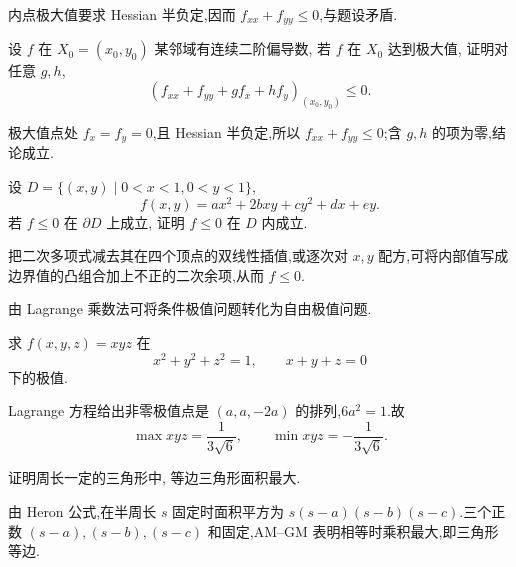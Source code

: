 \begin{solution}
    内点极大值要求 Hessian 半负定,因而 $f_{xx}+f_{yy}\leq0$,与题设矛盾.
\end{solution}

\begin{example}
    设 $f$ 在 $X_0=(x_0,y_0)$ 某邻域有连续二阶偏导数, 若 $f$ 在 $X_0$ 达到极大值, 证明对任意 $g,h$,
    \[
        \left(f_{xx}+f_{yy}+gf_x+hf_y\right)_{(x_0,y_0)}\leq0.
    \]
\end{example}
\exampleblank

\begin{solution}
    极大值点处 $f_x=f_y=0$,且 Hessian 半负定,所以 $f_{xx}+f_{yy}\leq0$;含 $g,h$ 的项为零,结论成立.
\end{solution}

\begin{example}
    设 $D=\{(x,y)\mid0<x<1,0<y<1\}$,
    \[
        f(x,y)=ax^2+2bxy+cy^2+dx+ey.
    \]
    若 $f\leq0$ 在 $\partial D$ 上成立, 证明 $f\leq0$ 在 $D$ 内成立.
\end{example}
\exampleblank

\begin{solution}
    把二次多项式减去其在四个顶点的双线性插值,或逐次对 $x,y$ 配方,可将内部值写成边界值的凸组合加上不正的二次余项,从而 $f\leq0$.
\end{solution}




由 Lagrange 乘数法可将条件极值问题转化为自由极值问题.

\begin{example}
    求 $f(x,y,z)=xyz$ 在
    \[
        x^2+y^2+z^2=1,
        \qquad x+y+z=0
    \]
    下的极值.
\end{example}
\exampleblank

\begin{solution}
    Lagrange 方程给出非零极值点是 $(a,a,-2a)$ 的排列,$6a^2=1$.故
    \[
        \max xyz=\dfrac{1}{3\sqrt{6}},\qquad
        \min xyz=-\dfrac{1}{3\sqrt{6}}.
    \]
\end{solution}

\begin{example}
    证明周长一定的三角形中, 等边三角形面积最大.
\end{example}
\exampleblank

\begin{solution}
    由 Heron 公式,在半周长 $s$ 固定时面积平方为 $s(s-a)(s-b)(s-c)$.三个正数 $(s-a),(s-b),(s-c)$ 和固定,AM--GM 表明相等时乘积最大,即三角形等边.
\end{solution}


